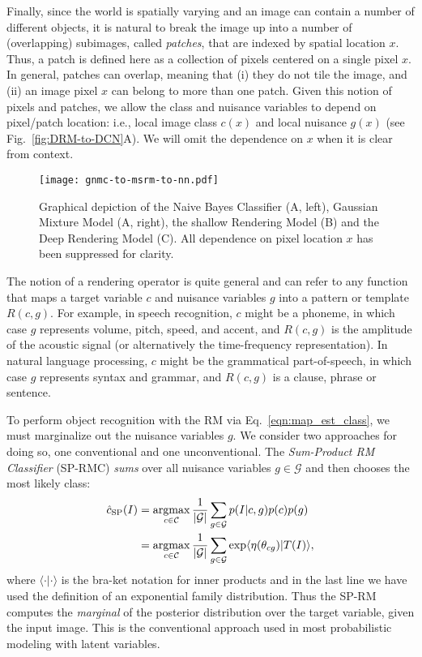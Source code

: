 \documentclass[12pt]{article}
\DeclareMathOperator*{\argmax}{argmax}
\newcommand{\Cl}[0]{{ \mathcal{C} }}
\newcommand{\G}[0]{{ \mathcal{G} }}
\begin{document}
Finally, since the world is spatially varying and an image can contain a number of different objects, it is natural to break the image up into a number of (overlapping) subimages, called \emph{patches}, that are indexed by spatial location $x$. Thus, a patch is defined here as a collection of pixels centered on a single pixel $x$. In general, patches can overlap, meaning that (i) they do not tile the image, and (ii) an image pixel $x$ can belong to more than one patch. Given this notion of pixels and patches, we allow the class and nuisance variables to depend on pixel/patch location: i.e., local image class $c(x)$ and local nuisance $g(x)$ (see Fig.~\ref{fig:DRM-to-DCN}A).
We will omit the dependence on $x$ when it is clear from context.


\begin{figure}[t!]
   \centering
   \texttt{[image: gnmc-to-msrm-to-nn.pdf]} 
   \caption{Graphical depiction of the Naive Bayes Classifier (A, left),  Gaussian Mixture Model (A, right), the shallow Rendering Model (B) and the Deep Rendering Model (C). All dependence on pixel location $x$ has been suppressed for clarity.}
   \label{fig:bigFig}
\end{figure}


The notion of a rendering operator is quite general and can refer to any function that maps a target variable $c$ and nuisance variables $g$ into a pattern or template $R(c,g)$.
For example, in speech recognition, $c$ might be a phoneme, in which case $g$ represents volume, pitch, speed, and accent, and $R(c,g)$ is the amplitude of the acoustic signal (or alternatively the time-frequency representation). 
In natural language processing, $c$ might be the grammatical part-of-speech, in which case $g$ represents syntax and grammar, and $R(c,g)$ is a clause, phrase or sentence.

To perform object recognition with the RM via Eq.~\ref{eqn:map_est_class}, we must marginalize out the nuisance variables $g$. We consider two approaches for doing so, one conventional and one unconventional.
The {\em Sum-Product RM Classifier} (SP-RMC) {\em sums} over all nuisance variables $g \in \G$ and then chooses the most likely class:
\begin{align} 
	\label{eqn:spc}
	\hat{c}_{\rm SP}(I) &= \argmax_{c \in \Cl}  \frac{1}{|\G|} \sum_{g \in \G} p(I|c,g) p(c) p(g) \nonumber \\
	              &= \argmax_{c \in \Cl} \frac{1}{|\G|} \sum_{g \in \G} \exp \langle \eta(\theta_{cg}) | T(I) \rangle,
\end{align}
where $\langle \cdot | \cdot \rangle$ is the bra-ket notation for inner products and in the last line we have used the definition of an exponential family distribution.
Thus the SP-RM computes the {\em marginal} of the posterior distribution over the target variable, given the input image. This is the conventional approach used in most probabilistic modeling with latent variables.
\end{document}
